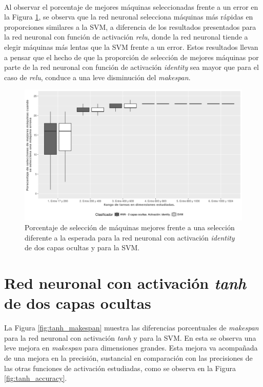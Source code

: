 \paragraph{}Al observar el porcentaje de mejores máquinas seleccionadas frente a un error en la Figura \ref{fig:identity_mejores}, se observa que la red neuronal selecciona máquinas más rápidas en proporciones similares a la SVM, a diferencia de los resultados presentados para la red neuronal con función de activación \textit{relu}, donde la red neuronal tiende a elegir máquinas más lentas que la SVM frente a un error.
Estos resultados llevan a pensar que el hecho de que la proporción de selección de mejores máquinas por parte de la red neuronal con función de activación \textit{identity} sea mayor que para el caso de \textit{relu}, conduce a una leve disminución del \textit{makespan}. 

\begin{figure}[H]
  \centering
  \includegraphics[width=\columnwidth]{imagenes/identity/4_porcentaje_maquinas_mejores_ann_2_capas_ocultas_identity.png}
  \caption{Porcentaje de selección de máquinas mejores frente a una selección diferente a la esperada para la red neuronal con activación \textit{identity} de dos capas ocultas y para la SVM.}
  \label{fig:identity_mejores}
\end{figure}

\section{Red neuronal con activación \textit{tanh} de dos capas ocultas}

La Figura \ref{fig:tanh_makespan} muestra las diferencias porcentuales de \textit{makespan} para la red neuronal con activación \textit{tanh} y para la SVM.
En esta se observa una leve mejora en \textit{makespan} para dimensiones grandes.
Esta mejora va acompañada de una mejora en la precisión, sustancial en comparación con las precisiones de las otras funciones de activación estudiadas, como se observa en la Figura \ref{fig:tanh_accuracy}.
 

